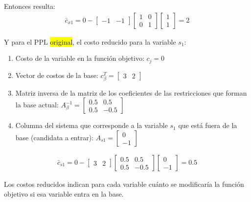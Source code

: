 Entonces resulta:
\begin{align*}
  \bar{c}_{x1} = 0 - \begin{bmatrix} -1 & -1 \end{bmatrix} \begin{bmatrix} 1 & 0\\ 0 & 1 \end{bmatrix} \begin{bmatrix} 1\\ 1 \end{bmatrix} = 2
\end{align*}

Y para el PPL \hl{original}, el costo reducido para la variable \(s_1\):
\begin{enumerate}
  \item Costo de la variable en la función objetivo: \(c_j = 0\)
  \item Vector de costos de la base: \(c_\beta^T = \begin{bmatrix} 3 & 2 \end{bmatrix}\)
  \item Matriz inversa de la matriz de los coeficientes de las restricciones que forman la base actual: \(A_\beta^{-1} = \begin{bmatrix} 0.5 & 0.5\\ 0.5 & -0.5 \end{bmatrix}\)
  \item Columna del sistema que corresponde a la variable \(s_1\) que está fuera de la base (candidata a entrar): \(A_{s1} = \begin{bmatrix} 0\\ -1 \end{bmatrix}\)
\end{enumerate}
\begin{align*}
  \bar{c}_{s1} = 0 - \begin{bmatrix} 3 & 2 \end{bmatrix} \begin{bmatrix} 0.5 & 0.5\\ 0.5 & -0.5 \end{bmatrix} \begin{bmatrix} 0\\ -1 \end{bmatrix} = 0.5
\end{align*}

\begin{tcolorbox}[remember, title=¿Para qué usamos costos reducidos?]
  Los costos reducidos indican para cada variable cuánto se modificaría la función objetivo si esa variable entra en la base.
\end{tcolorbox}

